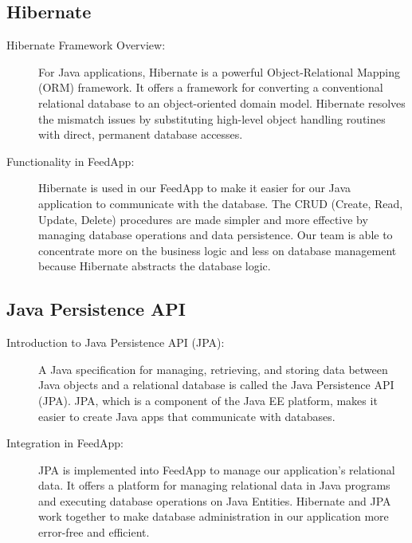 \subsection{Hibernate}
\begin{description}
 \item[Hibernate Framework Overview:]
For Java applications, Hibernate is a powerful Object-Relational Mapping (ORM) framework. It offers a framework for converting a conventional relational database to an object-oriented domain model. Hibernate resolves the mismatch issues by substituting high-level object handling routines with direct, permanent database accesses.

 \item[Functionality in FeedApp:]
Hibernate is used in our FeedApp to make it easier for our Java application to communicate with the database. The CRUD (Create, Read, Update, Delete) procedures are made simpler and more effective by managing database operations and data persistence. Our team is able to concentrate more on the business logic and less on database management because Hibernate abstracts the database logic.
\end{description}

\subsection{Java Persistence API}
\begin{description}
 \item[Introduction to Java Persistence API (JPA):]
A Java specification for managing, retrieving, and storing data between Java objects and a relational database is called the Java Persistence API (JPA). JPA, which is a component of the Java EE platform, makes it easier to create Java apps that communicate with databases.

 \item[Integration in FeedApp:]
JPA is implemented into FeedApp to manage our application's relational data. It offers a platform for managing relational data in Java programs and executing database operations on Java Entities. Hibernate and JPA work together to make database administration in our application more error-free and efficient.
\end{description}

